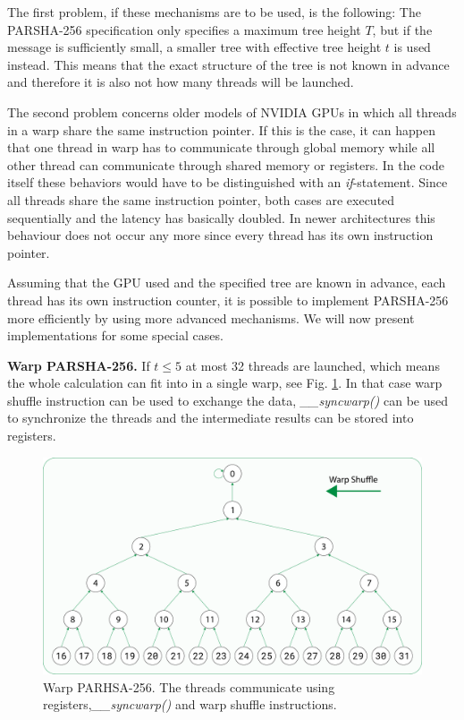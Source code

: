 \documentclass[letterpaper]{article}
\newcommand{\mypar}[1]{{\bf #1.}}
\begin{document}
The first problem, if these mechanisms are to be used, is the following: The PARSHA-256 specification only specifies a maximum tree height $T$, but if the message is sufficiently small, a smaller tree with effective tree height $t$ is used instead. This means that the exact structure of the tree is not known in advance and therefore it is also not how many threads will be launched.

The second problem concerns older models of NVIDIA GPUs in which all threads in a warp share the same instruction pointer. If this is the case, it can happen that one thread in warp has to communicate through global memory while all other thread can communicate through shared memory or registers.
In the code itself these behaviors would have to be distinguished with an \emph{if}-statement. Since all threads share the same instruction pointer, both cases are executed sequentially and the latency has basically doubled. In newer architectures this behaviour does not occur any more since every thread has its own instruction pointer.

Assuming that the GPU used and the specified tree are known in advance, each thread has its own instruction counter, it is possible to implement PARSHA-256 more efficiently by using more advanced mechanisms. We will now present implementations for some special cases.

\mypar{Warp PARSHA-256} If $t \leq 5$ at most 32 threads are launched, which means the whole calculation can fit into in a single warp, see Fig. \ref{fig:warp}. In that case warp shuffle instruction can be used to exchange the data, \emph{\_\_syncwarp()} can be used to synchronize the threads and the intermediate results can be stored into registers.

\begin{figure}[h]\centering
\includegraphics[scale=0.15]{warp2.pdf}
  \caption{Warp PARHSA-256. The threads communicate using registers,\emph{\_\_syncwarp()} and warp shuffle instructions. \label{fig:warp}}
\end{figure}
\end{document}
